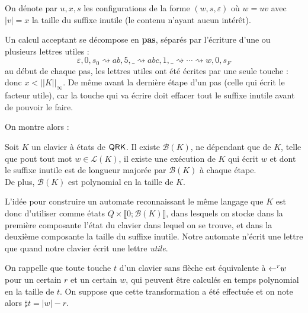 \documentclass[12pt, a4paper]{article}
\renewcommand{\L}{\mathcal{L}}
\newcommand{\Kinf}{||K||_{\infty}}
\begin{document}
    On dénote par $u,x,s$ les configurations de la forme $(w,s,\varepsilon)$ où $w = uv$ avec $|v| = x$ la taille du suffixe inutile (le contenu n'ayant aucun intérêt).
    \begin{pas}
        Un calcul acceptant se décompose en \textbf{pas}, séparés par l'écriture d'une ou plusieurs lettres utiles :
        \[ \varepsilon,0,s_0 \rightsquigarrow ab,5,\_ \rightsquigarrow abc,1,\_ \rightsquigarrow \cdots \rightsquigarrow w,0,s_F \]
        au début de chaque pas, les lettres utiles ont été écrites par une seule touche : donc $x < \Kinf$. De même avant la dernière étape d'un pas (celle qui écrit le facteur utile), car la touche qui va écrire doit effacer tout le suffixe inutile avant de pouvoir le faire.
    \end{pas}


    On montre alors :
    \begin{inutilesbornés}\label{bk}
        Soit $K$ un clavier à états de $\mathsf{QRK}$. Il existe $\mathcal{B}(K)$, ne dépendant que de $K$, telle que pout tout mot $w \in \L(K)$,
        il existe une exécution de $K$ qui écrit $w$ et dont le suffixe inutile est de longueur majorée par $\mathcal{B}(K)$ à chaque étape. \\
        De plus, $\mathcal{B}(K)$ est polynomial en la taille de $K$.
    \end{inutilesbornés}
    L'idée pour construire un automate reconnaissant le même langage que $K$ est donc d'utiliser comme états $Q \times \llbracket 0 ; \mathcal{B}(K) \rrbracket$, dans lesquels on stocke dans la première composante l'état du clavier dans lequel on se trouve,
    et dans la deuxième composante la taille du suffixe inutile. Notre automate n'écrit une lettre que quand notre clavier écrit une lettre \emph{utile}.
    
    On rappelle que toute touche $t$ d'un clavier sans flèche est équivalente à $\mathord{\leftarrow}^r w$ pour un certain $r$ et un certain $w$, qui peuvent être calculés en temps polynomial en la taille de $t$. On suppose que cette transformation a été effectuée et on note alors $\sharp t = |w| - r$.
\end{document}

